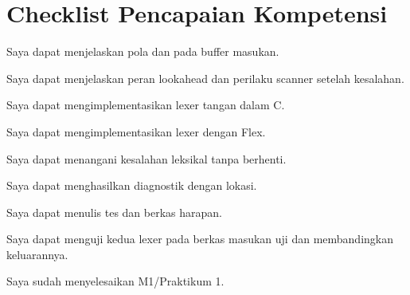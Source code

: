 \section*{Checklist Pencapaian Kompetensi}

\begin{checklist}
  \item Saya dapat menjelaskan pola  dan 
        pada buffer masukan.
  \item Saya dapat menjelaskan peran lookahead dan perilaku scanner
        setelah kesalahan.
  \item Saya dapat mengimplementasikan lexer tangan dalam C.
  \item Saya dapat mengimplementasikan lexer dengan Flex.
  \item Saya dapat menangani kesalahan leksikal tanpa berhenti.
  \item Saya dapat menghasilkan diagnostik dengan lokasi.
  \item Saya dapat menulis tes dan berkas harapan.
  \item Saya dapat menguji kedua lexer pada berkas masukan uji dan
        membandingkan keluarannya.
  \item Saya sudah menyelesaikan M1/Praktikum 1.
\end{checklist}
